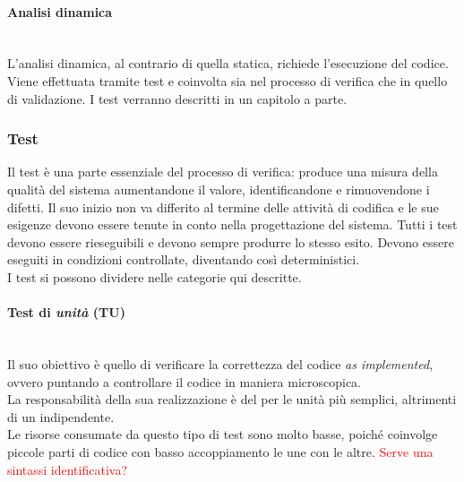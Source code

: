 \paragraph{Analisi dinamica}
~\\L'analisi dinamica, al contrario di quella statica, richiede l'esecuzione del codice.
Viene effettuata tramite test e coinvolta sia nel processo di verifica che in quello di validazione.
I test verranno descritti in un capitolo a parte.
\subsubsection{Test}
Il test è una parte essenziale del processo di verifica: produce una misura della qualità del sistema
aumentandone il valore, identificandone e rimuovendone i difetti. Il suo inizio non va differito
al termine delle attività di codifica e le sue esigenze devono essere tenute in conto nella progettazione del sistema. Tutti i test devono essere rieseguibili e devono sempre produrre lo stesso esito. Devono essere eseguiti in condizioni controllate, diventando così deterministici.
~\\I test si possono dividere nelle categorie qui descritte.
	\paragraph{\textbf{Test di \emph{unità}} \textbf{(TU)}}
	~\\Il suo obiettivo è quello di verificare la correttezza del codice \emph{as implemented}, ovvero
	puntando a controllare il codice in maniera microscopica.
	\\La responsabilità della sua realizzazione è del \progr{} per le unità più semplici, altrimenti
	di un \ver{} indipendente.
	\\Le risorse consumate da questo tipo di test sono molto basse, poiché coinvolge piccole parti di codice con basso accoppiamento le une con le altre. 
	\textcolor{red}{Serve una sintassi identificativa?}
